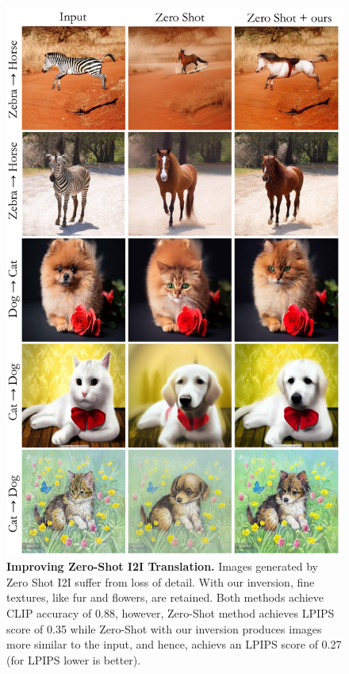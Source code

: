 \begin{figure}
\centering
\includegraphics[width=0.96\columnwidth]{ICCV23_submission/figures/zero-shot-results.pdf}
\caption{\textbf{Improving Zero-Shot I2I Translation.} Images generated by Zero Shot I2I suffer from loss of detail. With our inversion, fine textures, like fur and flowers, are retained. 
Both methods achieve CLIP accuracy of 0.88, however, Zero-Shot method achieves LPIPS score of 0.35 while Zero-Shot with our inversion produces images more similar to the input, and hence, achievs an LPIPS score of 0.27 (for LPIPS lower is better).}
\label{fig:zero-short-qualitative}
\end{figure}



